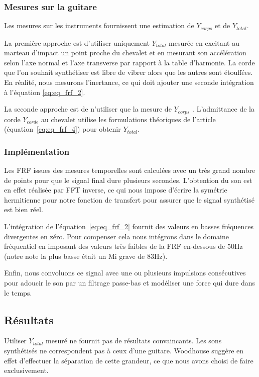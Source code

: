 \subsubsection{Mesures sur la guitare}
Les mesures sur les instruments fournissent une estimation de $Y_{corps}$ et de $Y_{total}$.

La première approche est d'utiliser uniquement $Y_{total}$ mesurée en
excitant au marteau d'impact un point proche du chevalet et en mesurant son accélération selon l'axe normal et l'axe transverse par rapport à la table
d'harmonie. La corde que l'on souhait synthétiser est libre de vibrer
alors que les autres sont étouffées. En réalité, nous mesurons l'inertance,
ce qui doit ajouter une seconde intégration à l'équation \ref{eq:eq_frf_2}.

La seconde approche est de n'utiliser que la mesure de $Y_{corps}$ .
L'admittance de la corde $Y_{corde}$ au chevalet utilise les formulations théoriques de l'article (équation~\ref{eq:eq_frf_4}) pour obtenir $Y_{total}$.

\subsubsection{Implémentation}
Les FRF issues des mesures temporelles sont calculées avec un très grand nombre de points pour que le signal final dure plusieurs secondes. L'obtention du son est en effet réalisée par FFT inverse, ce qui nous impose d'écrire la symétrie hermitienne pour notre fonction de transfert pour assurer que le signal synthétisé est bien réel.

L'intégration de l'équation~\ref{eq:eq_frf_2} fournit des valeurs en basses fréquences divergentes en zéro. Pour compenser cela nous intégrons dans le domaine fréquentiel en imposant des valeurs très faibles de la FRF en-dessous de
\( \si{50\Hz} \) (notre note la plus basse était un Mi grave de
\( \si{83\Hz} \)).

Enfin, nous convoluons ce signal avec une ou plusieurs impulsions consécutives pour adoucir le son par un filtrage passe-bas et modéliser une force qui dure dans le temps.

\subsection{Résultats}
%

Utiliser $Y_{total}$ mesuré ne fournit pas de résultats convaincants. Les sons synthétisés ne correspondent pas à ceux d'une guitare. Woodhouse suggère en effet d'effectuer la séparation de cette grandeur, ce que nous avons choisi de faire exclusivement.

